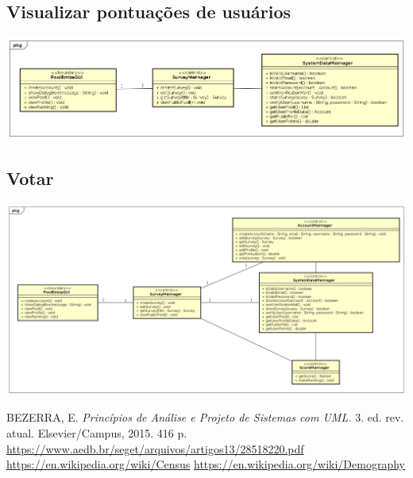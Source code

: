 \documentclass[a4paper,12pt]{report}
\begin{document}
\subsection*{Visualizar pontuações de usuários}
\markright{}
\includegraphics[width=14.3cm]{class_diagrams/ProjectClassDiagramVisualizarEnquetes.png}

\subsection*{Votar}
\markright{}
\includegraphics[width=14.3cm]{class_diagrams/ProjectClassDiagramVotar.png}

\newpage
\begin{thebibliography}{9}
	BEZERRA, E.
	\textit{Princípios de Análise e Projeto de Sistemas com UML.}
	 3. ed. rev. atual.
	 Elsevier/Campus,
	 2015.
	 416 p.
	\url{https://www.aedb.br/seget/arquivos/artigos13/28518220.pdf}
	\url{https://en.wikipedia.org/wiki/Census}
	\url{https://en.wikipedia.org/wiki/Demography}
\end{thebibliography}
\markright{}
\end{document}
